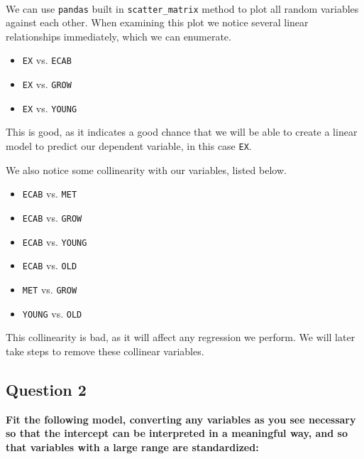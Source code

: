 \documentclass{article}
\begin{document}
    \begin{center}
    \end{center}
    { \hspace*{\fill} \\}
    
    We can use \texttt{pandas} built in \texttt{scatter\_matrix} method to
plot all random variables against each other. When examining this plot
we notice several linear relationships immediately, which we can
enumerate.

\begin{itemize}
\itemsep1pt\parskip0pt
\item
  \texttt{EX} vs. \texttt{ECAB}
\item
  \texttt{EX} vs. \texttt{GROW}
\item
  \texttt{EX} vs. \texttt{YOUNG}
\end{itemize}

This is good, as it indicates a good chance that we will be able to
create a linear model to predict our dependent variable, in this case
\texttt{EX}.

We also notice some collinearity with our variables, listed below.

\begin{itemize}
\itemsep1pt\parskip0pt
\item
  \texttt{ECAB} vs. \texttt{MET}
\item
  \texttt{ECAB} vs. \texttt{GROW}
\item
  \texttt{ECAB} vs. \texttt{YOUNG}
\item
  \texttt{ECAB} vs. \texttt{OLD}
\item
  \texttt{MET} vs. \texttt{GROW}
\item
  \texttt{YOUNG} vs. \texttt{OLD}
\end{itemize}

This collinearity is bad, as it will affect any regression we perform.
We will later take steps to remove these collinear variables.


    \subsection{Question 2}


    \textbf{Fit the following model, converting any variables as you see
necessary so that the intercept can be interpreted in a meaningful way,
and so that variables with a large range are standardized:}
\end{document}
